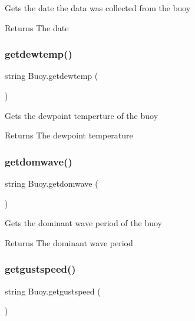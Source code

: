 Gets the date the data was collected from the buoy \begin{DoxyReturn}{Returns}
The date 
\end{DoxyReturn}
\mbox{\label{class_buoy_a7b9e88f8edb79946073523fc7acc325c}} 
\subsubsection{\texorpdfstring{getdewtemp()}{getdewtemp()}}
{\footnotesize\ttfamily string Buoy.\+getdewtemp (\begin{DoxyParamCaption}{ }\end{DoxyParamCaption})\hspace{0.3cm}{\ttfamily [inline]}}

Gets the dewpoint temperture of the buoy \begin{DoxyReturn}{Returns}
The dewpoint temperature 
\end{DoxyReturn}
\mbox{\label{class_buoy_ae19fe8af463418b675deacedeb7f2747}} 
\subsubsection{\texorpdfstring{getdomwave()}{getdomwave()}}
{\footnotesize\ttfamily string Buoy.\+getdomwave (\begin{DoxyParamCaption}{ }\end{DoxyParamCaption})\hspace{0.3cm}{\ttfamily [inline]}}

Gets the dominant wave period of the buoy \begin{DoxyReturn}{Returns}
The dominant wave period 
\end{DoxyReturn}
\mbox{\label{class_buoy_a9ddb36ab4c43611fc0b863eb0b2df958}} 
\subsubsection{\texorpdfstring{getgustspeed()}{getgustspeed()}}
{\footnotesize\ttfamily string Buoy.\+getgustspeed (\begin{DoxyParamCaption}{ }\end{DoxyParamCaption})\hspace{0.3cm}{\ttfamily [inline]}}


